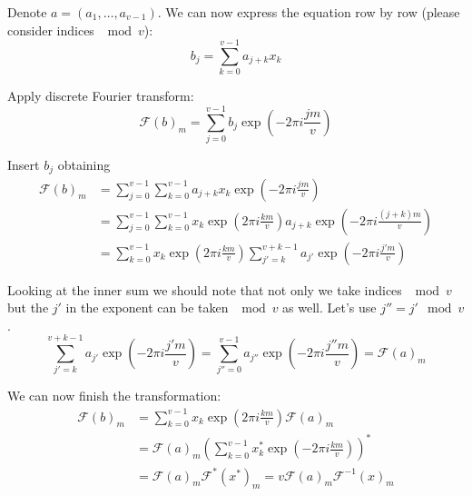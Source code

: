 \documentclass{article}
\theoremstyle{plain}
\theoremstyle{definition}
\theoremstyle{remark}
\begin{document}
                Denote $a=(a_1,\ldots,a_{v-1})$. We can now express the equation row by row (please consider indices $\mod v$):
                \begin{equation}
                    b_j = \sum_{k=0}^{v-1} a_{j+k} x_k
                \end{equation}
                
                Apply discrete Fourier transform:
                \begin{equation}
                    \mathcal{F} (b)_m = \sum_{j=0}^{v-1} b_j \exp(-2\pi i \frac{jm}v )
                \end{equation}
                
                Insert $b_j$ obtaining
                \begin{equation}
                \begin{split}
                    \mathcal{F} (b)_m
                    &= \sum_{j=0}^{v-1} \sum_{k=0}^{v-1} a_{j+k} x_k \exp(-2\pi i \frac{jm}v) \\
                    &= \sum_{j=0}^{v-1} \sum_{k=0}^{v-1} x_k \exp(2\pi i \frac{km}v) a_{j+k} \exp(-2\pi i \frac{(j+k)m}v)  \\
                    &= \sum_{k=0}^{v-1} x_k \exp(2\pi i \frac{km}v) \sum_{j'=k}^{v+k-1} a_{j'} \exp(-2\pi i \frac{j'm}v)
                \end{split}
                \end{equation}
                
                Looking at the inner sum we should note that not only we take indices $\mod v$ but the $j'$ in the exponent can be taken $\mod v$ as well. Let's use $j'' = j' \mod v$.
                \begin{equation}
                    \sum_{j'=k}^{v+k-1} a_{j'} \exp(-2\pi i \frac{j'm}v) = 
                    \sum_{j''=0}^{v-1} a_{j''} \exp(-2\pi i \frac{j''m}v) = \mathcal{F}(a)_m
                \end{equation}
                
                We can now finish the transformation:
                \begin{equation}
                \begin{split}
                    \mathcal{F} (b)_m
                    &= \sum_{k=0}^{v-1} x_k \exp(2\pi i \frac{km}v) \mathcal{F}(a)_m \\
                    &= \mathcal{F}(a)_m (\sum_{k=0}^{v-1} x^*_k \exp(-2\pi i \frac{km}v))^* \\
                    &= \mathcal{F}(a)_m \mathcal{F}^*(x^*)_m 
                    = v \mathcal{F}(a)_m \mathcal{F}^{-1}(x)_m
                \end{split}
                \end{equation}
                
\end{document}
